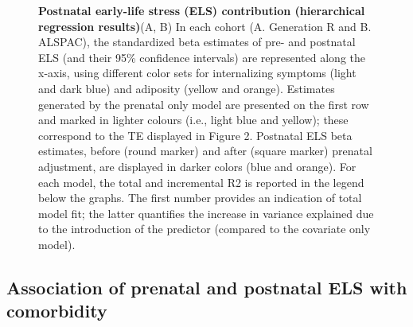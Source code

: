 \documentclass[
  letterpaper,
  DIV=11,
  numbers=noendperiod]{scrreport}
\begin{document}
\begin{figure}[H]


\caption{\label{fig-1.3}\textbf{Postnatal early-life stress (ELS)
contribution (hierarchical regression results)}\newline(A, B) In each
cohort (A. Generation R and B. ALSPAC), the standardized beta estimates
of pre- and postnatal ELS (and their 95\% confidence intervals) are
represented along the x-axis, using different color sets for
internalizing symptoms (light and dark blue) and adiposity (yellow and
orange). Estimates generated by the prenatal only model are presented on
the first row and marked in lighter colours (i.e., light blue and
yellow); these correspond to the TE displayed in Figure 2. Postnatal ELS
beta estimates, before (round marker) and after (square marker) prenatal
adjustment, are displayed in darker colors (blue and orange). For each
model, the total and incremental R2 is reported in the legend below the
graphs. The first number provides an indication of total model fit; the
latter quantifies the increase in variance explained due to the
introduction of the predictor (compared to the covariate only model).}

\end{figure}%

\subsection{Association of prenatal and postnatal ELS with
comorbidity}\label{association-of-prenatal-and-postnatal-els-with-comorbidity-1}
\end{document}
